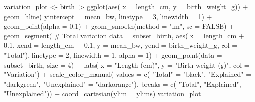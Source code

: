 \documentclass[
  letterpaper,
  DIV=11,
  numbers=noendperiod]{scrreprt}
\newenvironment{Shaded}{\begin{snugshade}}{\end{snugshade}}
\newcommand{\AttributeTok}[1]{\textcolor[rgb]{0.40,0.45,0.13}{#1}}
\newcommand{\CommentTok}[1]{\textcolor[rgb]{0.37,0.37,0.37}{#1}}
\newcommand{\ConstantTok}[1]{\textcolor[rgb]{0.56,0.35,0.01}{#1}}
\newcommand{\DecValTok}[1]{\textcolor[rgb]{0.68,0.00,0.00}{#1}}
\newcommand{\FloatTok}[1]{\textcolor[rgb]{0.68,0.00,0.00}{#1}}
\newcommand{\FunctionTok}[1]{\textcolor[rgb]{0.28,0.35,0.67}{#1}}
\newcommand{\NormalTok}[1]{\textcolor[rgb]{0.00,0.23,0.31}{#1}}
\newcommand{\OtherTok}[1]{\textcolor[rgb]{0.00,0.23,0.31}{#1}}
\newcommand{\SpecialCharTok}[1]{\textcolor[rgb]{0.37,0.37,0.37}{#1}}
\newcommand{\StringTok}[1]{\textcolor[rgb]{0.13,0.47,0.30}{#1}}
\begin{document}
\begin{Shaded}
\begin{Highlighting}[]
\NormalTok{variation\_plot }\OtherTok{\textless{}{-}}\NormalTok{ birth }\SpecialCharTok{|\textgreater{}} 
  \FunctionTok{ggplot}\NormalTok{(}\FunctionTok{aes}\NormalTok{(}
    \AttributeTok{x =}\NormalTok{ length\_cm, }
    \AttributeTok{y =}\NormalTok{ birth\_weight\_g)) }\SpecialCharTok{+} 
  \FunctionTok{geom\_hline}\NormalTok{(}
    \AttributeTok{yintercept =}\NormalTok{ mean\_bw,}
    \AttributeTok{linetype =} \DecValTok{3}\NormalTok{,}
    \AttributeTok{linewidth =} \DecValTok{1}\NormalTok{) }\SpecialCharTok{+}
  \FunctionTok{geom\_point}\NormalTok{(}\AttributeTok{alpha =} \FloatTok{0.1}\NormalTok{) }\SpecialCharTok{+} 
  \FunctionTok{geom\_smooth}\NormalTok{(}\AttributeTok{method =} \StringTok{"lm"}\NormalTok{, }\AttributeTok{se =} \ConstantTok{FALSE}\NormalTok{) }\SpecialCharTok{+}
  \FunctionTok{geom\_segment}\NormalTok{( }\CommentTok{\# Total variation}
    \AttributeTok{data =}\NormalTok{ subset\_birth,}
    \FunctionTok{aes}\NormalTok{(}
      \AttributeTok{x =}\NormalTok{ length\_cm }\SpecialCharTok{+} \FloatTok{0.1}\NormalTok{,}
      \AttributeTok{xend =}\NormalTok{ length\_cm }\SpecialCharTok{+} \FloatTok{0.1}\NormalTok{,}
      \AttributeTok{y =}\NormalTok{  mean\_bw,}
      \AttributeTok{yend =}\NormalTok{ birth\_weight\_g,}
      \AttributeTok{col =} \StringTok{"Total"}\NormalTok{),}
    \AttributeTok{linetype =} \DecValTok{2}\NormalTok{,}
    \AttributeTok{linewidth =} \DecValTok{1}\NormalTok{,}
    \AttributeTok{alpha =} \DecValTok{1}\NormalTok{) }\SpecialCharTok{+}
  \FunctionTok{geom\_point}\NormalTok{(}\AttributeTok{data =}\NormalTok{ subset\_birth, }\AttributeTok{size =} \DecValTok{4}\NormalTok{) }\SpecialCharTok{+} 
  \FunctionTok{labs}\NormalTok{(}
    \AttributeTok{x =} \StringTok{"Length (cm)"}\NormalTok{,}
    \AttributeTok{y =} \StringTok{"Birth weight (g)"}\NormalTok{,}
    \AttributeTok{col =} \StringTok{"Variation"}\NormalTok{) }\SpecialCharTok{+}
  \FunctionTok{scale\_color\_manual}\NormalTok{(}
    \AttributeTok{values =} \FunctionTok{c}\NormalTok{(}
      \StringTok{"Total"} \OtherTok{=} \StringTok{"black"}\NormalTok{,}
      \StringTok{"Explained"} \OtherTok{=} \StringTok{"darkgreen"}\NormalTok{, }
      \StringTok{"Unexplained"} \OtherTok{=} \StringTok{"darkorange"}\NormalTok{),}
    \AttributeTok{breaks =} \FunctionTok{c}\NormalTok{(}
      \StringTok{"Total"}\NormalTok{, }\StringTok{"Explained"}\NormalTok{, }\StringTok{"Unexplained"}\NormalTok{)) }\SpecialCharTok{+}
  \FunctionTok{coord\_cartesian}\NormalTok{(}\AttributeTok{ylim =}\NormalTok{ ylims)}
\NormalTok{variation\_plot}
\end{Highlighting}
\end{Shaded}
\end{document}
